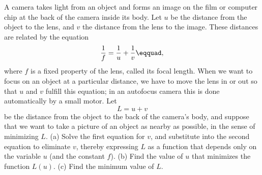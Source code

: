 A camera takes light from an object and forms an image on the
film or computer chip at the back of the camera inside its body. Let $u$ be the distance
from the object to the lens, and $v$ the distance from the lens
to the image. These distances are related by the equation
\begin{equation*}
  \frac{1}{f} = \frac{1}{u}+\frac{1}{v}\eqquad,
\end{equation*}
where $f$ is a fixed property of the lens, called its focal length.
When we want to focus on an object at a particular distance,
we have to move the lens in or out so that $u$ and $v$ fulfill
this equation; in an autofocus camera this is done automatically
by a small motor. Let
\begin{equation*}
  L = u+v
\end{equation*}
be the distance from the object to the back of the camera's body,
and suppose that we want to take a picture of an object as nearby
as possible, in the sense of minimizing $L$.\hwendpart
(a) Solve the first equation for $v$, and substitute into the
second equation to eliminate $v$, thereby expressing $L$ as a function
that depends only on the variable $u$ (and the constant $f$).\answercheck\hwendpart
(b) Find the value of $u$ that minimizes the function $L(u)$.\answercheck\hwendpart
(c) Find the minimum value of $L$.\answercheck\hwendpart
